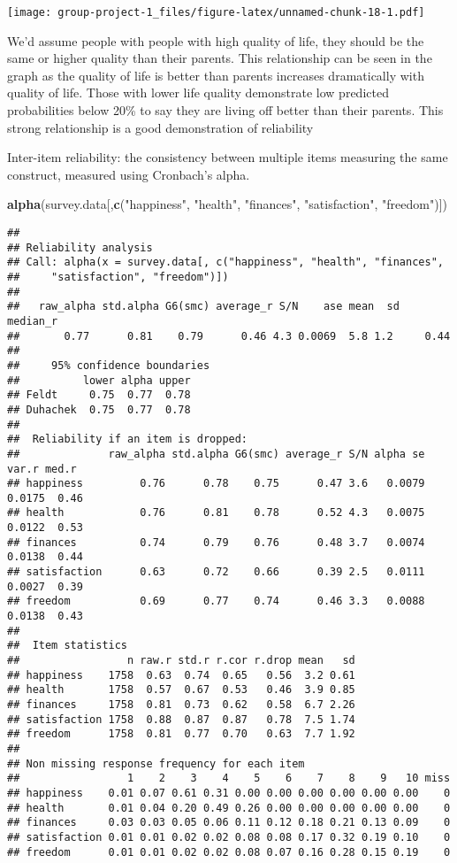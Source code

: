 \documentclass[
]{article}
\newenvironment{Shaded}{\begin{snugshade}}{\end{snugshade}}
\newcommand{\FunctionTok}[1]{\textcolor[rgb]{0.13,0.29,0.53}{\textbf{#1}}}
\newcommand{\NormalTok}[1]{#1}
\newcommand{\StringTok}[1]{\textcolor[rgb]{0.31,0.60,0.02}{#1}}
\begin{document}
\texttt{[image: group-project-1\_files/figure-latex/unnamed-chunk-18-1.pdf]}

\hfill\break
We'd assume people with people with high quality of life, they should be
the same or higher quality than their parents. This relationship can be
seen in the graph as the quality of life is better than parents
increases dramatically with quality of life. Those with lower life
quality demonstrate low predicted probabilities below 20\% to say they
are living off better than their parents. This strong relationship is a
good demonstration of reliability

Inter-item reliability: the consistency between multiple items measuring
the same construct, measured using Cronbach's alpha.

\begin{Shaded}
\begin{Highlighting}[]
\FunctionTok{alpha}\NormalTok{(survey.data[,}\FunctionTok{c}\NormalTok{(}\StringTok{"happiness"}\NormalTok{,}
                         \StringTok{"health"}\NormalTok{,}
                         \StringTok{"finances"}\NormalTok{, }
                         \StringTok{"satisfaction"}\NormalTok{,}
                         \StringTok{"freedom"}\NormalTok{)])}
\end{Highlighting}
\end{Shaded}

\begin{verbatim}
## 
## Reliability analysis   
## Call: alpha(x = survey.data[, c("happiness", "health", "finances", 
##     "satisfaction", "freedom")])
## 
##   raw_alpha std.alpha G6(smc) average_r S/N    ase mean  sd median_r
##       0.77      0.81    0.79      0.46 4.3 0.0069  5.8 1.2     0.44
## 
##     95% confidence boundaries 
##          lower alpha upper
## Feldt     0.75  0.77  0.78
## Duhachek  0.75  0.77  0.78
## 
##  Reliability if an item is dropped:
##              raw_alpha std.alpha G6(smc) average_r S/N alpha se  var.r med.r
## happiness         0.76      0.78    0.75      0.47 3.6   0.0079 0.0175  0.46
## health            0.76      0.81    0.78      0.52 4.3   0.0075 0.0122  0.53
## finances          0.74      0.79    0.76      0.48 3.7   0.0074 0.0138  0.44
## satisfaction      0.63      0.72    0.66      0.39 2.5   0.0111 0.0027  0.39
## freedom           0.69      0.77    0.74      0.46 3.3   0.0088 0.0138  0.43
## 
##  Item statistics 
##                 n raw.r std.r r.cor r.drop mean   sd
## happiness    1758  0.63  0.74  0.65   0.56  3.2 0.61
## health       1758  0.57  0.67  0.53   0.46  3.9 0.85
## finances     1758  0.81  0.73  0.62   0.58  6.7 2.26
## satisfaction 1758  0.88  0.87  0.87   0.78  7.5 1.74
## freedom      1758  0.81  0.77  0.70   0.63  7.7 1.92
## 
## Non missing response frequency for each item
##                 1    2    3    4    5    6    7    8    9   10 miss
## happiness    0.01 0.07 0.61 0.31 0.00 0.00 0.00 0.00 0.00 0.00    0
## health       0.01 0.04 0.20 0.49 0.26 0.00 0.00 0.00 0.00 0.00    0
## finances     0.03 0.03 0.05 0.06 0.11 0.12 0.18 0.21 0.13 0.09    0
## satisfaction 0.01 0.01 0.02 0.02 0.08 0.08 0.17 0.32 0.19 0.10    0
## freedom      0.01 0.01 0.02 0.02 0.08 0.07 0.16 0.28 0.15 0.19    0
\end{verbatim}
\end{document}
